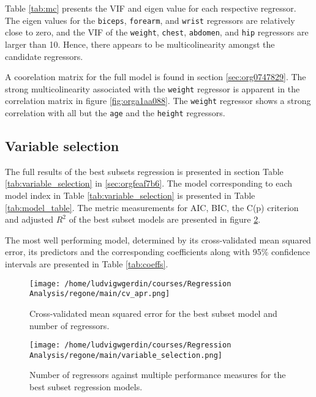 \documentclass[11pt]{article}
\begin{document}
Table \ref{tab:mc} presents the VIF and eigen value for each respective regressor. The eigen values for the 
\texttt{biceps}, \texttt{forearm}, and \texttt{wrist} regressors are relatively close to zero, and the
VIF of the \texttt{weight}, \texttt{chest}, \texttt{abdomen}, and \texttt{hip} regressors are larger than 10.
Hence, there appears to be multicolinearity amongst the candidate regressors.

A coorelation matrix for the full model is found in section \ref{sec:org0747829}. The strong multicolinearity
associated with the \texttt{weight} regressor is apparent in the correlation matrix in figure
\ref{fig:orga1aa088}. The \texttt{weight} regressor shows a strong correlation with all but the \texttt{age} and
the \texttt{height} regressors.

 

\subsection{Variable selection}
\label{sec:orge0334d7}

The full results of the best subsets regression is presented in section Table \ref{tab:variable_selection}
in \ref{sec:orgfeaf7b6}. The model corresponding to each model index in Table \ref{tab:variable_selection} is presented in
Table \ref{tab:model_table}. The metric measurements for AIC, BIC, the C(p) criterion and adjusted \(R^2\) 
of the best subset models are presented in figure \ref{fig:org095f15b}. 

The most well performing model, determined by its cross-validated mean squared error, its predictors and
the corresponding coefficients along with 95\% confidence intervals are presented in Table \ref{tab:coeffs}.

\begin{figure}[htbp]
\centering
\texttt{[image: /home/ludvigwgerdin/courses/Regression Analysis/regone/main/cv\_apr.png]}
\caption{\label{fig:org01d2d47}
Cross-validated mean squared error for the best subset model and number of regressors.}
\end{figure}

\begin{figure}[htbp]
\centering
\texttt{[image: /home/ludvigwgerdin/courses/Regression Analysis/regone/main/variable\_selection.png]}
\caption{\label{fig:org095f15b}
Number of regressors against multiple performance measures for the best subset regression models.}
\end{figure}
\end{document}
